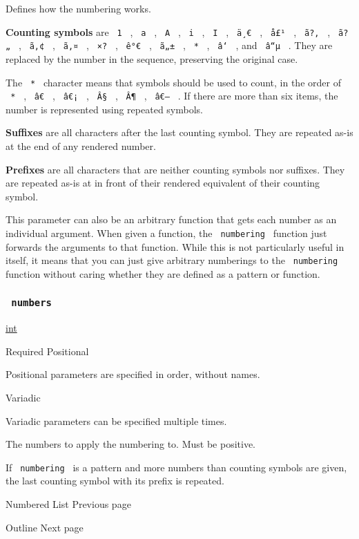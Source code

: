 Defines how the numbering works.

\textbf{Counting symbols} are \texttt{\ 1\ } , \texttt{\ a\ } ,
\texttt{\ A\ } , \texttt{\ i\ } , \texttt{\ I\ } , \texttt{\ ä¸€\ } ,
\texttt{\ å£¹\ } , \texttt{\ ã?‚\ } , \texttt{\ ã?„\ } ,
\texttt{\ ã‚¢\ } , \texttt{\ ã‚¤\ } , \texttt{\ ×?\ } , \texttt{\ ê°€\ }
, \texttt{\ ã„±\ } , \texttt{\ *\ } , \texttt{\ â‘\ } , and
\texttt{\ â“µ\ } . They are replaced by the number in the sequence,
preserving the original case.

The \texttt{\ *\ } character means that symbols should be used to count,
in the order of \texttt{\ *\ } , \texttt{\ â€\ } , \texttt{\ â€¡\ } ,
\texttt{\ Â§\ } , \texttt{\ Â¶\ } , \texttt{\ â€–\ } . If there are more
than six items, the number is represented using repeated symbols.

\textbf{Suffixes} are all characters after the last counting symbol.
They are repeated as-is at the end of any rendered number.

\textbf{Prefixes} are all characters that are neither counting symbols
nor suffixes. They are repeated as-is at in front of their rendered
equivalent of their counting symbol.

This parameter can also be an arbitrary function that gets each number
as an individual argument. When given a function, the
\texttt{\ numbering\ } function just forwards the arguments to that
function. While this is not particularly useful in itself, it means that
you can just give arbitrary numberings to the \texttt{\ numbering\ }
function without caring whether they are defined as a pattern or
function.

\subsubsection{\texorpdfstring{\texttt{\ numbers\ }}{ numbers }}\label{parameters-numbers}

\href{/docs/reference/foundations/int/}{int}

{Required} {{ Positional }}

\label{parameters-numbers-positional-tooltip}
Positional parameters are specified in order, without names.

{{ Variadic }}

\label{parameters-numbers-variadic-tooltip}
Variadic parameters can be specified multiple times.

The numbers to apply the numbering to. Must be positive.

If \texttt{\ numbering\ } is a pattern and more numbers than counting
symbols are given, the last counting symbol with its prefix is repeated.

\href{/docs/reference/model/enum/}{\pandocbounded{}}

{ Numbered List } { Previous page }

\href{/docs/reference/model/outline/}{\pandocbounded{}}

{ Outline } { Next page }
